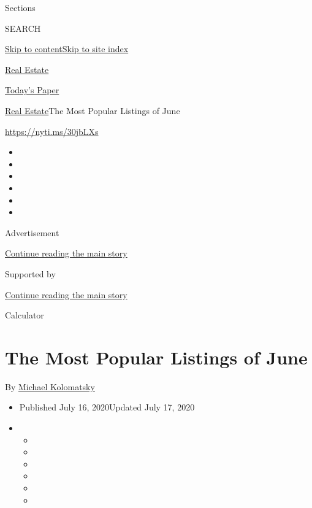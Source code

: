 Sections

SEARCH

\protect\hyperlink{site-content}{Skip to
content}\protect\hyperlink{site-index}{Skip to site index}

\href{https://www.nytimes3xbfgragh.onion/section/realestate}{Real
Estate}

\href{https://myaccount.nytimes3xbfgragh.onion/auth/login?response_type=cookie\&client_id=vi}{}

\href{https://www.nytimes3xbfgragh.onion/section/todayspaper}{Today's
Paper}

\href{/section/realestate}{Real Estate}\textbar{}The Most Popular
Listings of June

\url{https://nyti.ms/30jbLXs}

\begin{itemize}
\item
\item
\item
\item
\item
\item
\end{itemize}

Advertisement

\protect\hyperlink{after-top}{Continue reading the main story}

Supported by

\protect\hyperlink{after-sponsor}{Continue reading the main story}

Calculator

\hypertarget{the-most-popular-listings-of-june}{%
\section{The Most Popular Listings of
June}\label{the-most-popular-listings-of-june}}

By
\href{https://www.nytimes3xbfgragh.onion/by/michael-kolomatsky}{Michael
Kolomatsky}

\begin{itemize}
\item
  Published July 16, 2020Updated July 17, 2020
\item
  \begin{itemize}
  \item
  \item
  \item
  \item
  \item
  \item
  \end{itemize}
\end{itemize}

